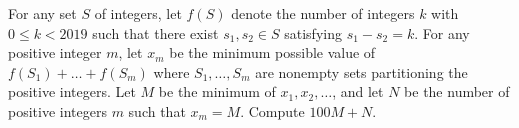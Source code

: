 For any set $S$ of integers, let $f(S)$ denote the number of integers $k$ with $0 \le k < 2019$ such that there exist $s_1, s_2 \in S$ satisfying $s_1 - s_2 = k$. For any positive integer $m$, let $x_m$ be the minimum possible value of $f(S_1) + \dots + f(S_m)$ where $S_1, \dots, S_m$ are nonempty sets partitioning the positive integers. Let $M$ be the minimum of $x_1, x_2, \dots$, and let $N$ be the number of positive integers $m$ such that $x_m = M$. Compute $100M + N$.
